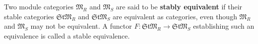 Two module categories $\mathfrak{M}_R$ and $\mathfrak{M}_S$ are said to be \textbf{stably equivalent} if their stable categories $\mathfrak{StM}_R$ and $\mathfrak{StM}_S$ are equivalent as categories, even though $\mathfrak{M}_R$ and $\mathfrak{M}_S$ may not be equivalent. A functor $F: \mathfrak{StM}_R \to \mathfrak{StM}_S$ establishing such an equivalence is called a stable equivalence.
